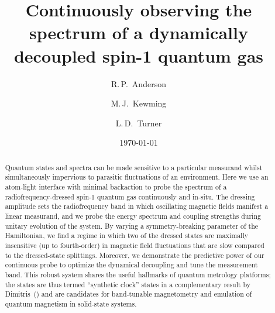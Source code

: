 \documentclass[aps,prl,reprint,superscriptaddress,floatfix]{revtex4-1}
\begin{document}
\title{Continuously observing the spectrum of a dynamically decoupled spin-1 quantum gas}

\author{R.\,P.~Anderson}
\author{M.\,J.~Kewming }
\author{L.\,D.~Turner}

\date{\today}

\begin{abstract}
Quantum states and spectra can be made sensitive to a particular measurand whilst simultaneously impervious to parasitic fluctuations of an environment.
Here we use an atom-light interface with minimal backaction to probe the spectrum of a radiofrequency-dressed spin-1 quantum gas continuously and in-situ.
The dressing amplitude sets the radiofrequency band in which oscillating magnetic fields manifest a linear measurand, and we probe the energy spectrum and coupling strengths during unitary evolution of the system.
By varying a symmetry-breaking parameter of the Hamiltonian, we find a regime in which two of the dressed states are maximally insensitive (up to fourth-order) in magnetic field fluctuations that are slow compared to the dressed-state splittings.
Moreover, we demonstrate the predictive power of our continuous probe to optimize the dynamical decoupling and tune the measurement band.
This robust system shares the useful hallmarks of quantum metrology platforms; the states are thus termed ``synthetic clock'' states in a complementary result by Dimitris~\etal (\dimitris) and are candidates for band-tunable magnetometry and emulation of quantum magnetism in solid-state systems. 
\end{abstract}

\maketitle
\end{document}
